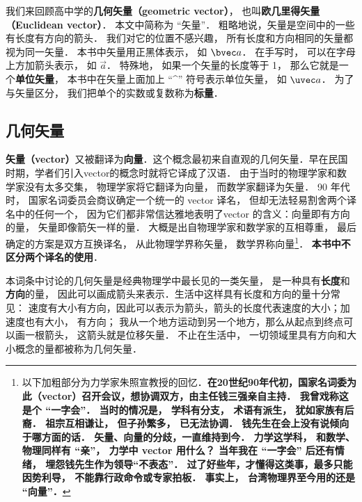 

我们来回顾高中学的\textbf{几何矢量（geometric vector）}， 也叫\textbf{欧几里得矢量（Euclidean vector）}． 本文中简称为 “矢量”． 粗略地说，矢量是空间中的一些有长度有方向的箭头． 我们对它的位置不感兴趣， 所有长度和方向相同的矢量都视为同一矢量． 本书中矢量用正黑体表示， 如 $\bvec a$． 在手写时， 可以在字母上方加箭头表示， 如 $\overrightarrow{a}$． 特殊地， 如果一个矢量的长度等于 1， 那么它就是一个\textbf{单位矢量}， 本书中在矢量上面加上 “\^{}” 符号表示单位矢量， 如 $\uvec a$． 为了与矢量区分， 我们把单个的实数或复数称为\textbf{标量}．

\subsection{几何矢量}

\textbf{矢量（vector）}又被翻译为\textbf{向量}．这个概念最初来自直观的几何矢量．早在民国时期，学者们引入vector的概念时就将它译成了汉语． 由于当时的物理学家和数学家没有太多交集， 物理学家将它翻译为向量， 而数学家翻译为矢量． 90 年代时， 国家名词委员会商议确定一个统一的 vector 译名， 但却无法轻易割舍两个译名中的任何一个， 因为它们都非常信达雅地表明了vector 的含义：向量即有方向的量， 矢量即像箭矢一样的量． 大概是出自物理学家和数学家的互相尊重， 最后确定的方案是双方互换译名， 从此物理学界称矢量， 数学界称向量\footnote{以下加粗部分为力学家朱照宣教授的回忆．\textbf{在20世纪90年代初，国家名词委为此（vector）召开会议，想协调双方，由主任钱三强亲自主持． 我曾戏称这是个 “一字会”． 当时的情况是， 学科有分支， 术语有派生， 犹如家族有后裔． 祖宗互相谦让， 但子孙繁多， 已无法协调． 钱先生在会上没有说倾向于哪方面的话． 矢量、向量的分歧，一直维持到今． 力学这学科， 和数学、物理同样有 “亲”， 力学中 vector 用什么？ 当年我在 “一字会” 后还有情绪， 埋怨钱先生作为领导“不表态”． 过了好些年，才懂得这类事，最多只能因势利导， 不能靠行政命令或专家拍板． 事实上， 台湾物理界至今用的还是 “向量”．}}． \textbf{本书中不区分两个译名的使用}．

本词条中讨论的几何矢量是经典物理学中最长见的一类矢量， 是一种具有\textbf{长度}和\textbf{方向}的量， 因此可以画成箭头来表示．生活中这样具有长度和方向的量十分常见： 速度有大小有方向，因此可以表示为箭头，箭头的长度代表速度的大小；加速度也有大小， 有方向； 我从一个地方运动到另一个地方，那么从起点到终点可以画一根箭头， 这箭头就是位移矢量． 不止在生活中， 一切领域里具有方向和大小概念的量都被称为几何矢量． 


